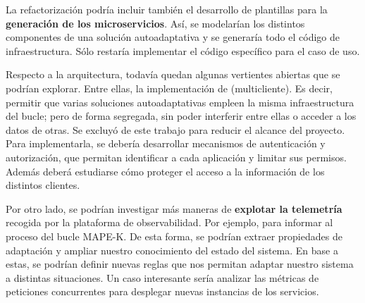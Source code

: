 La refactorización podría incluir también el desarrollo de plantillas para la \textbf{generación de los microservicios}. Así, se modelarían los distintos componentes de una solución autoadaptativa y se generaría todo el código de infraestructura. Sólo restaría implementar el código específico para el caso de uso.

Respecto a la arquitectura, todavía quedan algunas vertientes abiertas que se podrían explorar. Entre ellas, la implementación de \textbf{} (multicliente). \cite{aljahdaliMultitenancyCloudComputing2014} Es decir, permitir que varias soluciones autoadaptativas empleen la misma infraestructura del bucle; pero de forma segregada, sin poder interferir entre ellas o acceder a los datos de otras. Se excluyó de este trabajo para reducir el alcance del proyecto. Para implementarla, se debería desarrollar mecanismos de autenticación y autorización, que permitan identificar a cada aplicación y limitar sus permisos. Además deberá estudiarse cómo proteger el acceso a la información de los distintos clientes.

Por otro lado, se podrían investigar más maneras de \textbf{explotar la telemetría} recogida por la plataforma de observabilidad. Por ejemplo, para informar al proceso del bucle MAPE-K. De esta forma, se podrían extraer propiedades de adaptación y ampliar nuestro conocimiento del estado del sistema. En base a estas, se podrían definir nuevas reglas que nos permitan adaptar nuestro sistema a distintas situaciones. Un caso interesante sería analizar las métricas de peticiones concurrentes para desplegar nuevas instancias de los servicios.
